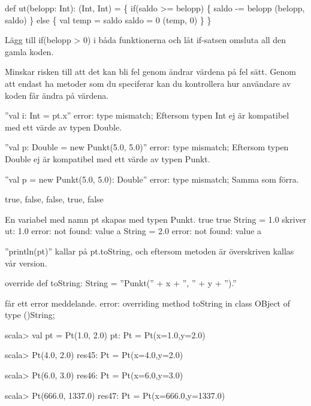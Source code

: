 \Subtask 
\begin{REPLnonum}
def ut(belopp: Int): (Int, Int) = \{
	if(saldo >= belopp) \{
		saldo -= belopp
		(belopp, saldo)
	\} else \{
		val temp = saldo
		saldo = 0
		(temp, 0)
	\}
\}
\end{REPLnonum}

\Subtask 
Lägg till if(belopp > 0) i båda funktionerna och låt if-satsen omsluta all den gamla koden.

\Subtask 
Minskar risken till att det kan bli fel genom ändrar värdena på fel sätt. Genom att endast ha metoder som du speciferar kan du kontrollera hur användare av koden får ändra på värdena.

\Task %

\Subtask 
''val i: Int = pt.x'' error: type mismatch;
Eftersom typen Int ej är kompatibel med ett värde av typen Double.

''val p: Double = new Punkt(5.0, 5.0)'' error: type mismatch;
Eftersom typen Double ej är kompatibel med ett värde av typen Punkt.

''val p = new Punkt(5.0, 5.0): Double'' error: type mismatch;
Samma som förra.

\Subtask 
true, false, false, true, false

\Task %

\Subtask 
En variabel med namn pt skapas med typen Punkt.
true
true
String = 1.0
skriver ut: 1.0
error: not found: value a
String = 2.0
error: not found: value a

\Task %

\Subtask 
''println(pt)'' kallar på pt.toString, och eftersom metoden är överskriven kallas vår version.

\Subtask 
override def toString: String = ''Punkt('' + x + '', '' + y + '').''

\Subtask 
får ett error meddelande.
error: overriding method toString in class OBject of type ()String;

\Task %

\Subtask 
\begin{REPL}
scala> val pt = Pt(1.0, 2.0)
pt: Pt = Pt(x=1.0,y=2.0)

scala> Pt(4.0, 2.0)
res45: Pt = Pt(x=4.0,y=2.0)

scala> Pt(6.0, 3.0)
res46: Pt = Pt(x=6.0,y=3.0)

scala> Pt(666.0, 1337.0)
res47: Pt = Pt(x=666.0,y=1337.0)
\end{REPL}

\Subtask {}

